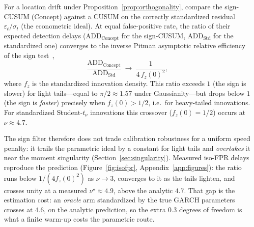 \documentclass[sigconf,anonymous,review]{acmart}
\theoremstyle{acmdefinition}
\begin{document}
\begin{proposition}\label{prop:are}
    For a location drift under Proposition~\ref{prop:orthogonality}, compare the sign-CUSUM (Concept) against a CUSUM on the correctly standardized residual $\varepsilon_t/\sigma_t$ (the econometric ideal). At equal false-positive rate, the ratio of their expected detection delays ($\mathrm{ADD}_{\mathrm{Concept}}$ for the sign-CUSUM, $\mathrm{ADD}_{\mathrm{Std}}$ for the standardized one) converges to the inverse Pitman asymptotic relative efficiency of the sign test~\cite{vandervaart_1998},
    \[
        \frac{\mathrm{ADD}_{\mathrm{Concept}}}{\mathrm{ADD}_{\mathrm{Std}}} \;\longrightarrow\; \frac{1}{4\,f_z(0)^2},
    \]
    where $f_z$ is the standardized innovation density. This ratio exceeds $1$ (the sign is slower) for light tails---equal to $\pi/2 \approx 1.57$ under Gaussianity---but drops below $1$ (the sign is \emph{faster}) precisely when $f_z(0) > 1/2$, i.e.\ for heavy-tailed innovations. For standardized Student-$t_\nu$ innovations this crossover ($f_z(0) = 1/2$) occurs at $\nu \approx 4.7$.
\end{proposition}

\noindent The sign filter therefore does not trade calibration robustness for a uniform speed penalty: it trails the parametric ideal by a constant for light tails and \emph{overtakes} it near the moment singularity (Section~\ref{sec:singularity}). Measured iso-FPR delays reproduce the prediction (Figure~\ref{fig:isofpr}, Appendix~\ref{app:figures}): the ratio runs below $1/(4f_z(0)^2)$ as $\nu \to 3$, converges to it as the tails lighten, and crosses unity at a measured $\nu^{\star} \approx 4.9$, above the analytic $4.7$. That gap is the estimation cost: an \emph{oracle} arm standardized by the true GARCH parameters crosses at $4.6$, on the analytic prediction, so the extra $0.3$ degrees of freedom is what a finite warm-up costs the parametric route.
\end{document}
